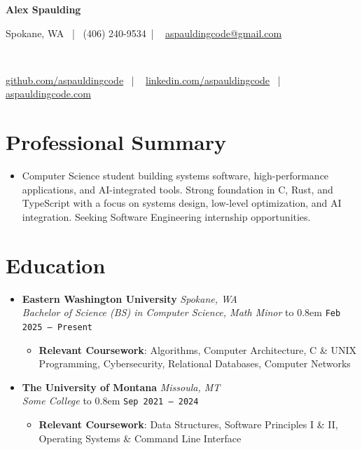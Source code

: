 \documentclass[letterpaper,10pt]{article}
\makeatletter
\newcommand{\resumetitle}[1]{{\huge\textbf{#1}}}
\newcommand{\resumesubtitleII}[1]{{\normalsize\textbf{#1}}}
\newcommand{\resumesubtitleIII}[1]{{\small\textit{#1}}}
\newcommand{\resumesubtitleIV}[1]{{\small\textit{#1}}}
\newcommand{\resumedate}[1]{{\small\texttt{#1}}}
\newcommand{\stylisticdots}{%
  \leavevmode\cleaders\hbox to 0.8em{%
    \hss\raisebox{0.6ex}{\color{black!40}\rule{1pt}{1pt}}\hss%
  }\hfill\kern0pt%
}
\newcommand{\resumeSubheading}[4]{
  \item
    \resumesubtitleII{#1} \hfill \resumesubtitleIV{#4} \\
    \resumesubtitleIII{#3} \stylisticdots \resumedate{#2}
}
\newcommand{\link}[2]{%
    \href{#1}{\textcolor{linkcolor}{\underline{#2}}}%
}
\newcommand{\resumeSubHeadingListStart}{%
    \begin{itemize}[leftmargin=0pt, label={}]%
}
\newcommand{\resumeSubHeadingListEnd}{\end{itemize}}
\newcommand{\resumeItemListStart}{%
    \begin{itemize}[leftmargin=3ex, labelsep=0.5em, rightmargin=0.143\textwidth]%
    \small%
}
\newcommand{\resumeItemListEnd}{\end{itemize}}
\newcommand{\name}{Alex Spaulding}
\newcommand{\phone}{(406) 240-9534}
\newcommand{\emaila}{aspauldingcode@gmail.com}
\makeatother
\begin{document}
\fontsize{10.8}{12.8}\selectfont
{}\selectfont

\begin{center}
    \resumetitle{\textcolor{cvaccent}{\name}} \\
    \vspace{2pt}
    \small{
        Spokane, WA \ | \ 
        \phone \ | \ 
        \link{mailto:\emaila}{\emaila}
    } \\
    \vspace{1pt}
    \small{
        \link{https://github.com/aspauldingcode}{github.com/aspauldingcode} \ | \ 
        \link{https://linkedin.com/in/aspauldingcode}{linkedin.com/aspauldingcode} \ | \ 
        \link{https://aspauldingcode.com}{aspauldingcode.com}
    }
\end{center}

\vspace{-10pt} 

\section{\textbf{Professional Summary}}
\begin{itemize}[leftmargin=0pt, label={}, topsep=1pt]
    \item \small \justifying Computer Science student building systems 
    software, high-performance applications, and AI-integrated tools. 
    Strong foundation in C, Rust, and TypeScript with a focus on 
    systems design, low-level optimization, and AI integration. 
    Seeking Software Engineering internship opportunities.
\end{itemize}
\vspace{-2pt}

\section{\textbf{Education}}
  \resumeSubHeadingListStart
    \resumeSubheading
      {Eastern Washington University}{Feb 2025 -- Present}%
      {Bachelor of Science (BS) in Computer Science, Math Minor}{Spokane, WA}
      \resumeItemListStart
        \item {\textbf{Relevant Coursework}{: Algorithms, Computer Architecture, 
        C \& UNIX Programming, Cybersecurity, Relational Databases, Computer Networks}}
      \resumeItemListEnd
    \resumeSubheading
      {The University of Montana}{Sep 2021 -- 2024}%
      {Some College}{Missoula, MT}
      \resumeItemListStart
        \item {\textbf{Relevant Coursework}{: Data Structures, 
        Software Principles I \& II, Operating Systems \& Command Line Interface}}
      \resumeItemListEnd
  \resumeSubHeadingListEnd
\end{document}
